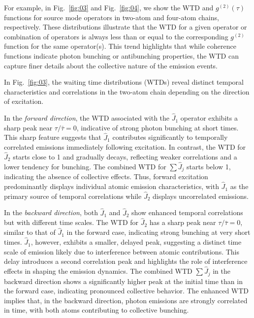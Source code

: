 \documentclass[aps,prl,twocolumn,superscriptaddress,showpacs,amsmath,amssymb]{revtex4-2}
\begin{document}
For example, in Fig.~\ref{fig:03} and Fig.~\ref{fig:04}, we show the WTD and $ g^{(2)}(\tau) $ functions for source mode operators in two-atom and four-atom chains, respectively. These distributions illustrate that the WTD for a given operator or combination of operators is always less than or equal to the corresponding $ g^{(2)} $ function for the same operator(s). This trend highlights that while coherence functions indicate photon bunching or antibunching properties, the WTD can capture finer details about the collective nature of the emission events.

In Fig.~\ref{fig:03}, the waiting time distributions (WTDs) reveal distinct temporal characteristics and correlations in the two-atom chain depending on the direction of excitation. 

In the \textit{forward direction}, the WTD associated with the $ \hat{J}_1 $ operator exhibits a sharp peak near $ \tau / \bar{\tau} = 0 $, indicative of strong photon bunching at short times. This sharp feature suggests that $ \hat{J}_1 $ contributes significantly to temporally correlated emissions
immediately following excitation. In contrast, the WTD for $ \hat{J}_2 $ starts close to 1 and gradually decays, reflecting weaker correlations and a lower tendency for bunching. The combined WTD for $ \sum \hat{J}_j $ starts below 1, indicating the absence of collective effects. Thus, forward excitation predominantly displays individual atomic emission characteristics, with $ \hat{J}_1 $ as the primary source of temporal correlations while $ \hat{J}_2 $ displays uncorrelated emissions.

In the \textit{backward direction}, both $ \hat{J}_1 $ and $ \hat{J}_2 $ show enhanced temporal correlations but with different time scales. The WTD for $ \hat{J}_2 $ has a sharp peak near $ \tau / \bar{\tau} = 0 $, similar to that of $ \hat{J}_1 $ in the forward case, indicating strong bunching at
very short times. $ \hat{J}_1 $, however, exhibits a smaller, delayed peak, suggesting a distinct time scale of emission likely due to interference between atomic contributions. This delay introduces a second correlation peak and highlights the role of interference effects in shaping the emission
dynamics. The combined WTD $ \sum \hat{J}_j $ in the backward direction shows a significantly higher peak at the initial time than in the forward case, indicating pronounced collective behavior. The enhanced WTD implies that, in the backward direction, photon emissions are strongly correlated in time, with both atoms contributing to collective bunching.
\end{document}
